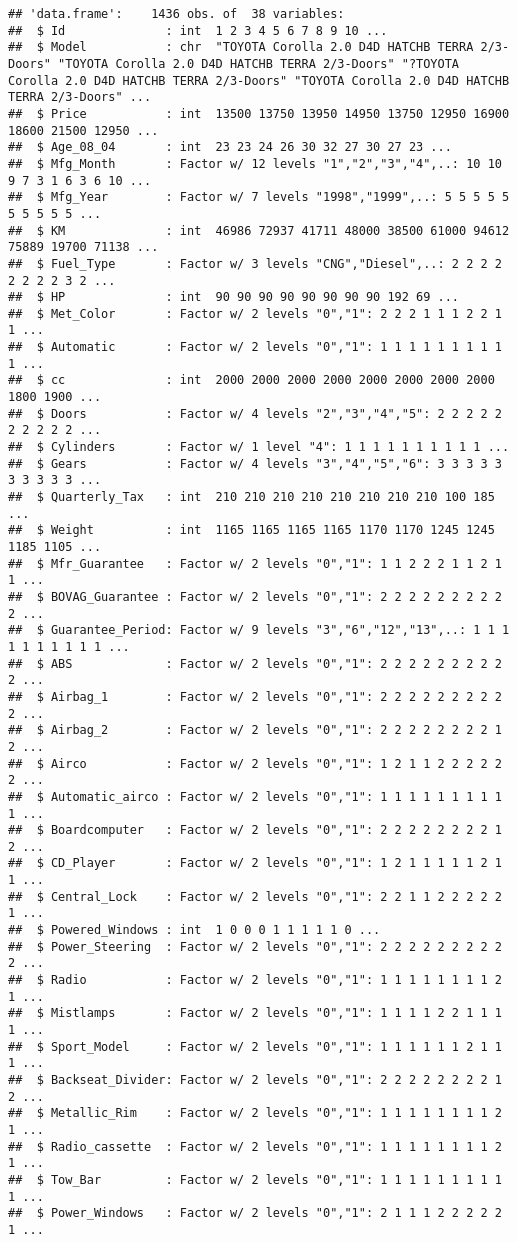 \documentclass[
]{article}
\begin{document}
\begin{verbatim}
## 'data.frame':    1436 obs. of  38 variables:
##  $ Id              : int  1 2 3 4 5 6 7 8 9 10 ...
##  $ Model           : chr  "TOYOTA Corolla 2.0 D4D HATCHB TERRA 2/3-Doors" "TOYOTA Corolla 2.0 D4D HATCHB TERRA 2/3-Doors" "?TOYOTA Corolla 2.0 D4D HATCHB TERRA 2/3-Doors" "TOYOTA Corolla 2.0 D4D HATCHB TERRA 2/3-Doors" ...
##  $ Price           : int  13500 13750 13950 14950 13750 12950 16900 18600 21500 12950 ...
##  $ Age_08_04       : int  23 23 24 26 30 32 27 30 27 23 ...
##  $ Mfg_Month       : Factor w/ 12 levels "1","2","3","4",..: 10 10 9 7 3 1 6 3 6 10 ...
##  $ Mfg_Year        : Factor w/ 7 levels "1998","1999",..: 5 5 5 5 5 5 5 5 5 5 ...
##  $ KM              : int  46986 72937 41711 48000 38500 61000 94612 75889 19700 71138 ...
##  $ Fuel_Type       : Factor w/ 3 levels "CNG","Diesel",..: 2 2 2 2 2 2 2 2 3 2 ...
##  $ HP              : int  90 90 90 90 90 90 90 90 192 69 ...
##  $ Met_Color       : Factor w/ 2 levels "0","1": 2 2 2 1 1 1 2 2 1 1 ...
##  $ Automatic       : Factor w/ 2 levels "0","1": 1 1 1 1 1 1 1 1 1 1 ...
##  $ cc              : int  2000 2000 2000 2000 2000 2000 2000 2000 1800 1900 ...
##  $ Doors           : Factor w/ 4 levels "2","3","4","5": 2 2 2 2 2 2 2 2 2 2 ...
##  $ Cylinders       : Factor w/ 1 level "4": 1 1 1 1 1 1 1 1 1 1 ...
##  $ Gears           : Factor w/ 4 levels "3","4","5","6": 3 3 3 3 3 3 3 3 3 3 ...
##  $ Quarterly_Tax   : int  210 210 210 210 210 210 210 210 100 185 ...
##  $ Weight          : int  1165 1165 1165 1165 1170 1170 1245 1245 1185 1105 ...
##  $ Mfr_Guarantee   : Factor w/ 2 levels "0","1": 1 1 2 2 2 1 1 2 1 1 ...
##  $ BOVAG_Guarantee : Factor w/ 2 levels "0","1": 2 2 2 2 2 2 2 2 2 2 ...
##  $ Guarantee_Period: Factor w/ 9 levels "3","6","12","13",..: 1 1 1 1 1 1 1 1 1 1 ...
##  $ ABS             : Factor w/ 2 levels "0","1": 2 2 2 2 2 2 2 2 2 2 ...
##  $ Airbag_1        : Factor w/ 2 levels "0","1": 2 2 2 2 2 2 2 2 2 2 ...
##  $ Airbag_2        : Factor w/ 2 levels "0","1": 2 2 2 2 2 2 2 2 1 2 ...
##  $ Airco           : Factor w/ 2 levels "0","1": 1 2 1 1 2 2 2 2 2 2 ...
##  $ Automatic_airco : Factor w/ 2 levels "0","1": 1 1 1 1 1 1 1 1 1 1 ...
##  $ Boardcomputer   : Factor w/ 2 levels "0","1": 2 2 2 2 2 2 2 2 1 2 ...
##  $ CD_Player       : Factor w/ 2 levels "0","1": 1 2 1 1 1 1 1 2 1 1 ...
##  $ Central_Lock    : Factor w/ 2 levels "0","1": 2 2 1 1 2 2 2 2 2 1 ...
##  $ Powered_Windows : int  1 0 0 0 1 1 1 1 1 0 ...
##  $ Power_Steering  : Factor w/ 2 levels "0","1": 2 2 2 2 2 2 2 2 2 2 ...
##  $ Radio           : Factor w/ 2 levels "0","1": 1 1 1 1 1 1 1 1 2 1 ...
##  $ Mistlamps       : Factor w/ 2 levels "0","1": 1 1 1 1 2 2 1 1 1 1 ...
##  $ Sport_Model     : Factor w/ 2 levels "0","1": 1 1 1 1 1 1 2 1 1 1 ...
##  $ Backseat_Divider: Factor w/ 2 levels "0","1": 2 2 2 2 2 2 2 2 1 2 ...
##  $ Metallic_Rim    : Factor w/ 2 levels "0","1": 1 1 1 1 1 1 1 1 2 1 ...
##  $ Radio_cassette  : Factor w/ 2 levels "0","1": 1 1 1 1 1 1 1 1 2 1 ...
##  $ Tow_Bar         : Factor w/ 2 levels "0","1": 1 1 1 1 1 1 1 1 1 1 ...
##  $ Power_Windows   : Factor w/ 2 levels "0","1": 2 1 1 1 2 2 2 2 2 1 ...
\end{verbatim}
\end{document}
